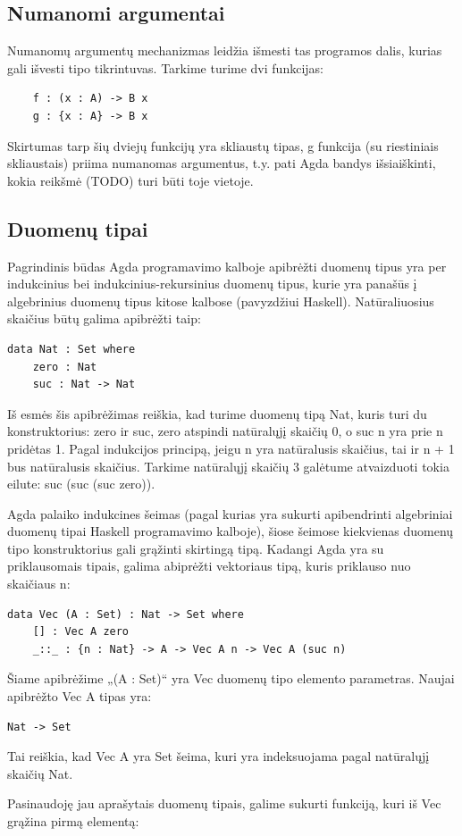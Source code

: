 \documentclass{VUMIFPSkursinis}
\begin{document}
\subsection{Numanomi argumentai}
Numanomų argumentų mechanizmas leidžia išmesti tas programos dalis, kurias gali išvesti tipo tikrintuvas. Tarkime turime dvi funkcijas:
\begin{lstlisting}
	f : (x : A) -> B x
	g : {x : A} -> B x
\end{lstlisting}
Skirtumas tarp šių dviejų funkcijų yra skliaustų tipas, g funkcija (su riestiniais skliaustais) priima numanomas argumentus, t.y. pati Agda bandys išsiaiškinti, kokia reikšmė (TODO) turi būti toje vietoje.
\subsection{Duomenų tipai}
Pagrindinis būdas Agda programavimo kalboje apibrėžti duomenų tipus yra per indukcinius bei indukcinius-rekursinius duomenų tipus, kurie yra panašūs į algebrinius duomenų tipus kitose kalbose (pavyzdžiui Haskell). Natūraliuosius  skaičius būtų galima apibrėžti taip:
\begin{lstlisting}
data Nat : Set where
	zero : Nat
	suc : Nat -> Nat
\end{lstlisting}
Iš esmės šis apibrėžimas reiškia, kad turime duomenų tipą Nat, kuris turi du konstruktorius: zero ir suc, zero atspindi natūralųjį skaičių 0, o suc n yra prie n pridėtas 1. Pagal indukcijos principą, jeigu n yra natūralusis skaičius, tai ir n + 1 bus natūralusis skaičius. Tarkime natūralųjį skaičių 3 galėtume atvaizduoti tokia eilute: suc (suc (suc zero)).\par Agda palaiko indukcines šeimas (pagal kurias yra sukurti apibendrinti algebriniai duomenų tipai Haskell programavimo kalboje), šiose šeimose kiekvienas duomenų tipo konstruktorius gali grąžinti skirtingą tipą. Kadangi Agda yra su priklausomais tipais, galima abiprėžti vektoriaus tipą, kuris priklauso nuo skaičiaus n:
\begin{lstlisting}
data Vec (A : Set) : Nat -> Set where
	[] : Vec A zero
	_::_ : {n : Nat} -> A -> Vec A n -> Vec A (suc n)
\end{lstlisting}
Šiame apibrėžime „(A : Set)“ yra Vec duomenų tipo elemento parametras. Naujai apibrėžto Vec A tipas yra:
\begin{lstlisting}
Nat -> Set
\end{lstlisting}
Tai reiškia, kad Vec A yra Set šeima, kuri yra indeksuojama pagal natūralųjį skaičių Nat.
\par Pasinaudoję jau aprašytais duomenų tipais, galime sukurti funkciją, kuri iš Vec grąžina pirmą elementą:
\end{document}
